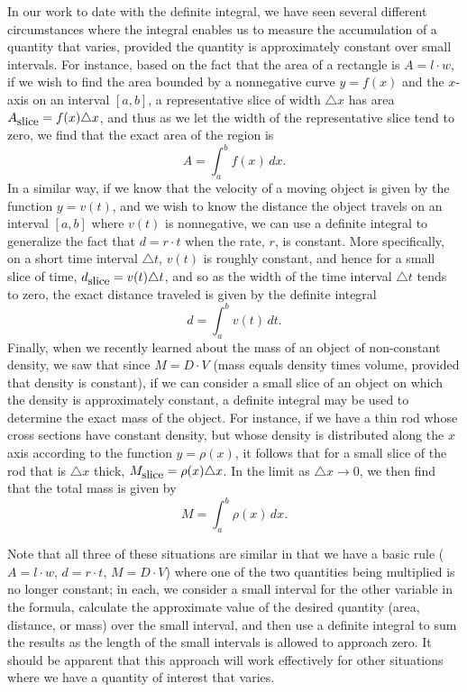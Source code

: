 In our work to date with the definite integral, we have seen several different circumstances where the integral enables us to measure the accumulation of a quantity that varies, provided the quantity is approximately constant over small intervals.  For instance, based on the fact that the area of a rectangle is $A = l \cdot w$, if we wish to find the area bounded by a nonnegative curve $y = f(x)$ and the $x$-axis on an interval $[a,b]$, a representative slice of width $\triangle x$ has  area $A_{\mbox{\small{slice}}} = f(x) \triangle x$, and thus as we let the width of the representative slice tend to zero, we find that the exact area of the region is
$$A = \int_a^b f(x) \, dx.$$
In a similar way, if we know that the velocity of a moving object is given by the function $y = v(t)$, and we wish to know the distance the object travels on an interval $[a,b]$ where $v(t)$ is nonnegative, we can use a definite integral to generalize the fact that $d = r \cdot t$ when the rate, $r$, is constant.  More specifically, on a short time interval $\triangle t$, $v(t)$ is roughly constant, and hence for a small slice of time, $d_{\mbox{\small{slice}}} = v(t) \triangle t$, and so as the width of the time interval $\triangle t$ tends to zero, the exact distance traveled is given by the definite integral
$$d = \int_a^b v(t) \, dt.$$
Finally, when we recently learned about the mass of an object of non-constant density, we saw that since $M = D \cdot V$ (mass equals density times volume, provided that density is constant), if we can consider a small slice of an object on which the density is approximately constant, a definite integral may be used to determine the exact mass of the object.  For instance, if we have a thin rod whose cross sections have constant density, but whose density is distributed along the $x$ axis according to the function $y = \rho(x)$, it follows that for a small slice of the rod that is $\triangle x$ thick, $M_{\mbox{\small{slice}}} = \rho(x) \triangle x$.  In the limit as $\triangle x \to 0$, we then find that the total mass is given by 
$$M = \int_a^b \rho(x) \, dx.$$

Note that all three of these situations are similar in that we have a basic rule ($A = l \cdot w$, $d = r \cdot t$, $M = D \cdot V$) where one of the two quantities being multiplied is no longer constant; in each, we consider a small interval for the other variable in the formula, calculate the approximate value of the desired quantity (area, distance, or mass) over the small interval, and then use a definite integral to sum the results as the length of the small intervals is allowed to approach zero.  It should be apparent that this approach will work effectively for other situations where we have a quantity of interest that varies.  

